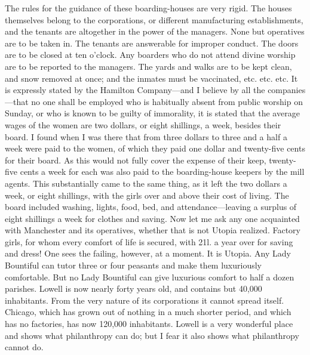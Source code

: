 The rules for the guidance of these boarding-houses are very rigid.
The houses themselves belong to the corporations, or different
manufacturing establishments, and the tenants are altogether in the
power of the managers.  None but operatives are to be taken in.
The tenants are answerable for improper conduct.  The doors are to
be closed at ten o'clock.  Any boarders who do not attend divine
worship are to be reported to the managers.  The yards and walks
are to be kept clean, and snow removed at once; and the inmates
must be vaccinated, etc. etc. etc.  It is expressly stated by the
Hamilton Company---and I believe by all the companies---that no one
shall be employed who is habitually absent from public worship on
Sunday, or who is known to be guilty of immorality, it is stated
that the average wages of the women are two dollars, or eight
shillings, a week, besides their board.  I found when I was there
that from three dollars to three and a half a week were paid to the
women, of which they paid one dollar and twenty-five cents for
their board.  As this would not fully cover the expense of their
keep, twenty-five cents a week for each was also paid to the
boarding-house keepers by the mill agents.  This substantially came
to the same thing, as it left the two dollars a week, or eight
shillings, with the girls over and above their cost of living.  The
board included washing, lights, food, bed, and attendance---leaving
a surplus of eight shillings a week for clothes and saving.  Now
let me ask any one acquainted with Manchester and its operatives,
whether that is not Utopia realized.  Factory girls, for whom every
comfort of life is secured, with 21l. a year over for saving and
dress!  One sees the failing, however, at a moment.  It is Utopia.
Any Lady Bountiful can tutor three or four peasants and make them
luxuriously comfortable.  But no Lady Bountiful can give luxurious
comfort to half a dozen parishes.  Lowell is now nearly forty years
old, and contains but 40,000 inhabitants.  From the very nature of
its corporations it cannot spread itself.  Chicago, which has grown
out of nothing in a much shorter period, and which has no
factories, has now 120,000 inhabitants.  Lowell is a very wonderful
place and shows what philanthropy can do; but I fear it also shows
what philanthropy cannot do.

